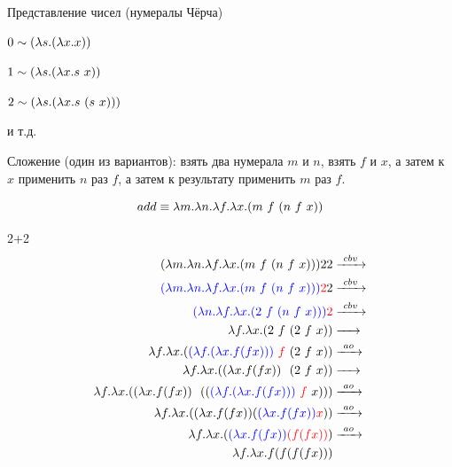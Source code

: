 \begin{frame}{Представление чисел (нумералы Чёрча)}

$ 0 \sim (\lambda s . (\lambda x . x))$

$ 1 \sim (\lambda s . (\lambda x . s\ x))$

$ 2 \sim \lam{s}{\lam{x}{s\ (s\ x)}}$

  и т.д.
  \vspace{1cm}

  Сложение (один из вариантов): взять два нумерала $m$ и $n$, взять $f$ и $x$, а затем к $x$ применить $n$ раз $f$, а затем к результату применить $m$ раз $f$.

  \[
  add \equiv \lambda m. \lambda n. \lambda f. \lambda x. (m\ f\  (n\ f\  x))
  \]
\end{frame}
\newcommand{\tb}[1]{\textcolor{blue}{#1}}
\newcommand{\tr}[1]{\textcolor{red}{#1}}
\begin{frame}{2+2}
  \begin{align*}
    (\lambda m. \lambda n. \lambda f. \lambda x. \app{m\ f\ }{\app{n\ f\ }{x}}){} 2 2 &\cbv \\
    \textcolor{blue}{(\lambda m. \lambda n. \lambda f. \lambda x. \app{m\ f\ }{\app{n\ f\ }{x}}) {}} \textcolor{red}{2} 2 &\cbv \\
    \textcolor{blue}{( \lambda n. \lambda f. \lambda x. \app{2\ f\ }{\app{n\ f\ }{x}}){}} \textcolor{red}{2} & \cbv \\
    \lambda f. \lambda x. \app{2\ f\ }{\app{2\ f\ }{x}}   &\xarr{\ \ } \\
    \lambda f. \lambda x. \app{\tb{\lam{f}{\lam{x}{f (f x)}}} \ \tr{f}\ }{\app{2\ f\ }{x}} &\ao \\
    \lambda f. \lambda x. \app{\lam{x}{f (f x)} \ \ }{\app{2\ f\ }{x}} &\xarr{\ \ } \\
    \lambda f. \lambda x. \app{\lam{x}{f (f x)} \ \ } {\app{\app{\tb{\lam{f}{\lam{x}{f (f x)}}}\ \tr{f}\ }{x}}} &\ao \\
    \lambda f. \lambda x. \app{\lam{x}{f (f x)}  } {\app{\tb{\lam{x}{f (f x)} } }{\tr{x}}} &\ao \\
    \lambda f. \lambda x. \app{\tb{\lam{x}{f (f x)} } } {\tr{(f (f x))}} &\ao \\
    \lambda f. \lambda x. f (f (f (f x))) &
  \end{align*}
\end{frame}

